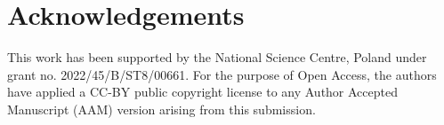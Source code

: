 
\section{Acknowledgements}
	This work has been supported by the National Science Centre, Poland under grant no. 2022/45/B/ST8/00661. For the purpose of Open Access, the authors have applied a CC-BY public copyright license to any Author Accepted Manuscript (AAM) version arising from this submission.
	